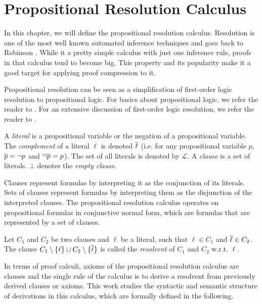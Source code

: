 \section{Propositional Resolution Calculus}
\label{sec:resolution}

In this chapter, we will define the propositional resolution calculus.
Resolution is one of the most well known automated inference techniques and goes back to Robinson \cite{TODO}.
While it a pretty simple calculus with just one inference rule, proofs in that calculus tend to become big.
This property and its popularity make it a good target for applying proof compression to it.

Propositional resolution can be seen as a simplification of first-order logic resolution to propositional logic.
For basics about propositional logic, we refer the reader to \cite{TODO}.
For an extensive discussion of first-order logic resolution, we refer the reader to \cite{TODO}.

\begin{definition}

A \emph{literal} is a propositional variable or the negation of a propositional variable. 
The \emph{complement} of a literal $\ell$ is denoted $\overline{\ell}$ (i.e. for any propositional variable $p$,
$\overline{p} = \neg p$ and $\overline{\neg p} = p$). 
The set of all literals is denoted by $\mathcal{L}$. 
A \emph{clause} is a set of literals. 
$\bot$ denotes the \emph{empty clause}.

\end{definition}

Clauses represent formulas by interpreting it as the conjunction of its literals.
Sets of clauses represent formulas by interpreting them as the disjunction of the interpreted clauses.
The propositional resolution calculus operates on propositional formulas in conjunctive normal form, which are formulas that are represented by a set of clauses.

\begin{definition}[Resolvent]

Let $C_1$ and $C_2$ be two clauses and $\ell$ be a literal, such that $\ell \in C_1$ and $\overline{\ell} \in C_2$.
The clause $C_1 \setminus \{\ell\} \cup C_2 \setminus \{\overline{\ell}\}$ is called the \emph{resolvent} of $C_1$ and $C_2$ w.r.t. $\ell$.

\end{definition}

In terms of proof calculi, axioms of the propositional resolution calculus are clauses and the single rule of the calculus is to derive a resolvent from previously derived clauses or axioms.
This work studies the syntactic and semantic structure of derivations in this calculus, which are formally defined in the following.

